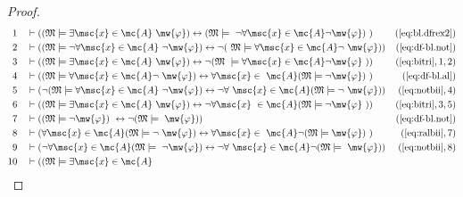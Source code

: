 \begin{proof}
\begin{align}
  1 &&  & \vdash ( ( \mathfrak{M} \models \exists \msc{x} \in \mc{A}
     ~\mw{\varphi} ) \leftrightarrow ( \mathfrak{M} \models
     ~\lnot \forall \msc{x} \in \mc{A} \lnot \mw{\varphi} )
     ~)&(\mbox{\ref{eq:bl.dfrex2}})\notag
  \\ 2 &&  & \vdash ( ( \mathfrak{M} \models \lnot \forall \msc{x} \in \mc{A}
     ~\lnot \mw{\varphi} ) \leftrightarrow \lnot (
     ~\mathfrak{M} \models \forall \msc{x} \in \mc{A} \lnot
     ~\mw{\varphi} ) )&(\mbox{\ref{eq:df-bl.not}})\notag
  \\ 3 &&  & \vdash ( ( \mathfrak{M} \models \exists \msc{x} \in \mc{A}
     ~\mw{\varphi} ) \leftrightarrow \lnot ( \mathfrak{M}
     ~\models \forall \msc{x} \in \mc{A} \lnot \mw{\varphi}
     ~) )&(\mbox{\ref{eq:bitri}},1,2)\notag
  \\ 4 &&  & \vdash ( ( \mathfrak{M} \models \forall \msc{x} \in \mc{A} \lnot
     ~\mw{\varphi} ) \leftrightarrow \forall \msc{x} \in
     ~\mc{A} ( \mathfrak{M} \models \lnot \mw{\varphi} )
     ~)&(\mbox{\ref{eq:df-bl.al}})\notag
  \\ 5 &&  & \vdash ( \lnot ( \mathfrak{M} \models \forall \msc{x} \in \mc{A}
     ~\lnot \mw{\varphi} ) \leftrightarrow \lnot \forall
     ~\msc{x} \in \mc{A} ( \mathfrak{M} \models \lnot
     ~\mw{\varphi} ) )&(\mbox{\ref{eq:notbii}},4)\notag
  \\ 6 &&  & \vdash ( ( \mathfrak{M} \models \exists \msc{x} \in \mc{A}
     ~\mw{\varphi} ) \leftrightarrow \lnot \forall \msc{x}
     ~\in \mc{A} ( \mathfrak{M} \models \lnot \mw{\varphi}
     ~) )&(\mbox{\ref{eq:bitri}},3,5)\notag
  \\ 7 &&  & \vdash ( ( \mathfrak{M} \models \lnot \mw{\varphi} )
     ~\leftrightarrow \lnot ( \mathfrak{M} \models
     ~\mw{\varphi} ) )&(\mbox{\ref{eq:df-bl.not}})\notag
  \\ 8 &&  & \vdash ( \forall \msc{x} \in \mc{A} ( \mathfrak{M} \models \lnot
     ~\mw{\varphi} ) \leftrightarrow \forall \msc{x} \in
     ~\mc{A} \lnot ( \mathfrak{M} \models \mw{\varphi} )
     ~)&(\mbox{\ref{eq:ralbii}},7)\notag
  \\ 9 &&  & \vdash ( \lnot \forall \msc{x} \in \mc{A} ( \mathfrak{M} \models
     ~\lnot \mw{\varphi} ) \leftrightarrow \lnot \forall
     ~\msc{x} \in \mc{A} \lnot ( \mathfrak{M} \models
     ~\mw{\varphi} ) )&(\mbox{\ref{eq:notbii}},8)\notag
  \\ 10 &&  & \vdash ( ( \mathfrak{M} \models \exists \msc{x} \in \mc{A}

\end{align}
\end{proof}
